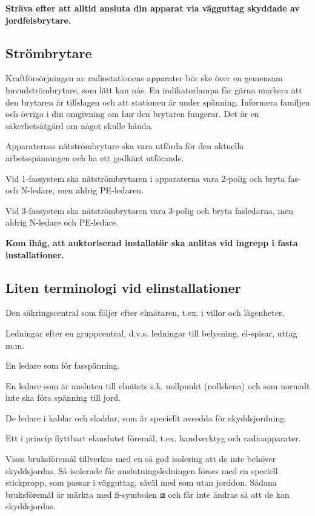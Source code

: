 \textbf{Sträva efter att alltid ansluta din apparat via vägguttag
	skyddade av jordfelsbrytare.}


\subsection{Strömbrytare}

Kraftförsörjningen av radiostationens apparater bör ske över en
gemensam huvudströmbrytare, som lätt kan nås.
En indikatorlampa får gärna markera att den brytaren är tillslagen och att
stationen är under spänning.
Informera familjen och övriga i din omgivning om hur den brytaren fungerar.
Det är en säkerhetsåtgärd om något skulle hända.

Apparaternas nätströmbrytare ska vara utförda för den aktuella arbetsspänningen
och ha ett godkänt utförande.

Vid 1-fassystem ska nätströmbrytaren i apparaterna vara 2-polig och bryta fas-
och N-ledare, men aldrig PE-ledaren.

Vid 3-fassystem ska nätströmbrytaren vara 3-polig och bryta fasledarna, men
aldrig N-ledare och PE-ledare.

\textbf{Kom ihåg, att auktoriserad installatör ska
  anlitas vid ingrepp i fasta installationer.}

\subsection{Liten terminologi vid elinstallationer}
\begin{description}[style=nextline]
\item[Gruppcentral] Den säkringscentral som följer efter elmätaren,
  t.ex. i villor och lägenheter.

\item[Gruppledningar] Ledningar efter en gruppcentral, d.v.s.
  ledningar till belysning, el-spisar, uttag m.m.

\item[Fasledare] En ledare som för fasspänning.

\item[Nolledare (N-ledare)] En ledare som är ansluten till elnätets s.k.
  nollpunkt (nollskena) och som normalt inte ska föra spänning till jord.

\item[Skyddsledare (PE-ledare)] De ledare i kablar och sladdar, som är
  speciellt avsedda för skyddsjordning.

\item[Bruksföremål] Ett i princip flyttbart elanslutet föremål,
  t.ex. handverktyg och radioapparater.

\item[Förstärkt isolering] Vissa bruksföremål tillverkas med en så god
  isolering att de inte behöver skyddsjordas.
  Så isolerade får anslutningsledningen förses med en speciell stickpropp,
  som passar i vägguttag, såväl med som utan jorddon.
  Sådana bruksföremål är märkta med fi-symbolen \(\boxbox\) och får inte ändras
  så att de kan skyddsjordas.
\end{description}

